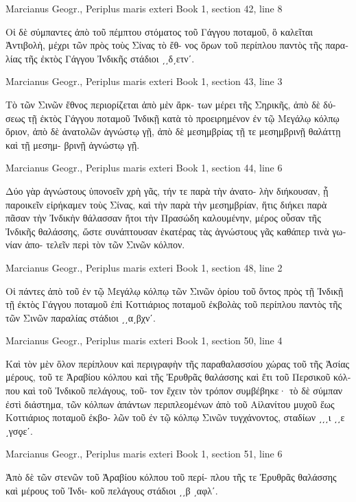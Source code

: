 \documentclass[12pt,letterpaper,twoside,final]{memoir}
\begin{document}
\begin{greek}
Marcianus Geogr., Periplus maris exteri 
Book 1, section 42, line 8

                                             Οἱ δὲ σύμπαντες 
ἀπὸ τοῦ πέμπτου στόματος τοῦ Γάγγου ποταμοῦ, ὃ 
καλεῖται Ἀντιβολὴ, μέχρι τῶν πρὸς τοὺς Σίνας τὸ ἔθ-
νος ὅρων τοῦ περίπλου παντὸς τῆς παραλίας τῆς ἐκτὸς 
Γάγγου Ἰνδικῆς στάδιοι ͵͵δ͵ετνʹ. 



Marcianus Geogr., Periplus maris exteri 
Book 1, section 43, line 3

Τὸ τῶν Σινῶν ἔθνος περιορίζεται ἀπὸ μὲν ἄρκ-
των μέρει τῆς Σηρικῆς, ἀπὸ δὲ δύσεως τῇ ἐκτὸς Γάγγου 
ποταμοῦ Ἰνδικῇ κατὰ τὸ προειρημένον ἐν τῷ Μεγάλῳ 
κόλπῳ ὅριον, ἀπὸ δὲ ἀνατολῶν ἀγνώστῳ γῇ, ἀπὸ δὲ 
μεσημβρίας τῇ τε μεσημβρινῇ θαλάττῃ καὶ τῇ μεσημ-
βρινῇ ἀγνώστῳ γῇ. 



Marcianus Geogr., Periplus maris exteri 
Book 1, section 44, line 6

                                               Δύο γὰρ 
ἀγνώστους ὑπονοεῖν χρὴ γᾶς, τήν τε παρὰ τὴν ἀνατο-
λὴν διήκουσαν, ᾗ παροικεῖν εἰρήκαμεν τοὺς Σίνας, 
καὶ τὴν παρὰ τὴν μεσημβρίαν, ἥτις διήκει παρὰ πᾶσαν 
τὴν Ἰνδικὴν θάλασσαν ἤτοι τὴν Πρασώδη καλουμένην, 
μέρος οὖσαν τῆς Ἰνδικῆς θαλάσσης, ὥστε συνάπτουσαν 
ἑκατέρας τὰς ἀγνώστους γᾶς καθάπερ τινὰ γωνίαν ἀπο-
τελεῖν περὶ τὸν τῶν Σινῶν κόλπον. 



Marcianus Geogr., Periplus maris exteri 
Book 1, section 48, line 2

Οἱ πάντες ἀπὸ τοῦ ἐν τῷ Μεγάλῳ κόλπῳ τῶν 
Σινῶν ὁρίου τοῦ ὄντος πρὸς τῇ Ἰνδικῇ τῇ ἐκτὸς Γάγγου 
ποταμοῦ ἐπὶ Κοττιάριος ποταμοῦ ἐκβολὰς τοῦ περίπλου 
παντὸς τῆς τῶν Σινῶν παραλίας στάδιοι ͵͵α͵βχνʹ. 



Marcianus Geogr., Periplus maris exteri 
Book 1, section 50, line 4

Καὶ τὸν μὲν ὅλον περίπλουν καὶ περιγραφὴν τῆς 
παραθαλασσίου χώρας τοῦ τῆς Ἀσίας μέρους, τοῦ τε 
Ἀραβίου κόλπου καὶ τῆς Ἐρυθρᾶς θαλάσσης καὶ ἔτι 
τοῦ Περσικοῦ κόλπου καὶ τοῦ Ἰνδικοῦ πελάγους, τοῦ-
τον ἔχειν τὸν τρόπον συμβέβηκε· τὸ δὲ σύμπαν ἐστὶ 
διάστημα, τῶν κόλπων ἁπάντων περιπλεομένων ἀπὸ 
τοῦ Αἰλανίτου μυχοῦ ἕως Κοττιάριος ποταμοῦ ἐκβο-
λῶν τοῦ ἐν τῷ κόλπῳ Σινῶν τυγχάνοντος, σταδίων 
͵͵͵ι ͵͵ε ͵γσϙεʹ. 



Marcianus Geogr., Periplus maris exteri 
Book 1, section 51, line 6

Ἀπὸ δὲ τῶν στενῶν τοῦ Ἀραβίου κόλπου τοῦ περί-
πλου τῆς τε Ἐρυθρᾶς θαλάσσης καὶ μέρους τοῦ Ἰνδι-
κοῦ πελάγους στάδιοι ͵͵β ͵αφλʹ. 




\end{greek}
\end{document}
